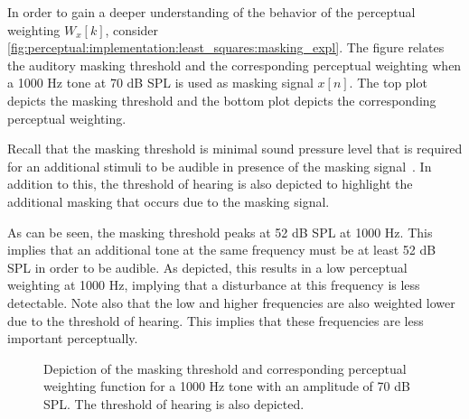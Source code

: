 In order to gain a deeper understanding of the behavior of the perceptual weighting $W_x[k]$, consider 
\autoref{fig:perceptual:implementation:least_squares:masking_expl}.
The figure relates the auditory masking threshold and the corresponding 
perceptual weighting when a 1000 Hz tone at 70 dB SPL is used as masking signal $x[n]$.
The top plot depicts the masking threshold and the bottom plot depicts the corresponding perceptual weighting.

Recall that the masking threshold is minimal sound pressure level that is required for an 
additional stimuli to be audible in presence of the masking signal~\cite{painter2000perceptual}.
In addition to this, the threshold of hearing is also depicted to highlight the additional 
masking that occurs due to the masking signal.

As can be seen, the masking threshold peaks at 52 dB SPL at 1000 Hz.
This implies that an additional tone at the same frequency must be at least 52 dB SPL in order to be audible.
As depicted, this results in a low perceptual weighting at 1000 Hz, implying that a disturbance at this frequency is less detectable.
Note also that the low and higher frequencies are also weighted lower due to the threshold of hearing.
This implies that these frequencies are less important perceptually.

\begin{figure}[]
    \centering
    \scalebox{1.0}{}
    \caption{Depiction of the masking threshold and corresponding perceptual weighting 
        function for a 1000 Hz tone with an amplitude of 70 dB SPL.
        The threshold of hearing is also depicted.}
    \label{fig:perceptual:implementation:least_squares:masking_expl}
\end{figure}
